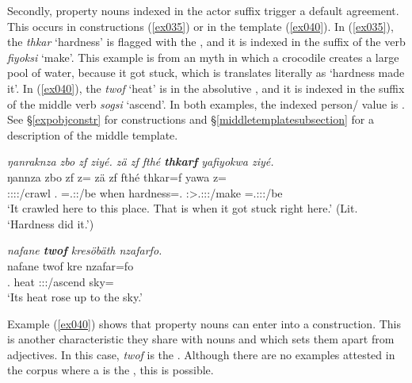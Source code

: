 Secondly, property nouns indexed in the actor suffix trigger a default   agreement. This occurs in  constructions (\ref{ex035}) or in the  template (\ref{ex040}). In (\ref{ex035}), the  \emph{thkar} `hardness' is flagged with the  , and it is indexed in the suffix of the verb \emph{fiyoksi} `make'. This example is from an myth in which a crocodile creates a large pool of water, because it got stuck, which is translates literally as `hardness made it'. In (\ref{ex040}), the  \emph{twof} `heat' is in the absolutive , and it is indexed in the suffix of the middle verb \emph{sogsi} `ascend'. In both examples, the indexed person/ value is \Stsg. See \S{}\ref{expobjconstr} for  constructions and \S{}\ref{middletemplatesubsection} for a description of the middle template.

\begin{exe}
	\ex \emph{ŋanraknza zbo zf ziyé. zä zf fthé \textbf{thkarf} yafiyokwa ziyé.}\\
	\gll ŋannza zbo zf z= zä zf fthé thkar=f yawa z=\\
	\Stsg:\Sbj:\Pst:\Ipfv:\Venit/crawl \Prox.\All{} \Imm{} \Prox=\Tsg.\Masc:\Sbj:\Nonpast/be \Prox{} \Imm{} when hardness=\Erg.\Sg{} \Stsg:\Sbj>\Tsg.\Masc:\Obj:\Pst:\Ipfv/make \Prox=\Tsg.\Masc:\Sbj:\Nonpast:\Ipfv/be\\
	\trans `It crawled here to this place. That is when it got stuck right here.' (Lit. `Hardness did it.')
	\label{ex035}
\end{exe}
\begin{exe}
	\ex \emph{nafane \textbf{twof} kresöbäth nzafarfo.}\\
	\gll nafane twof kre nzafar=fo\\
	\Tsg{}.\Poss{} heat \Stsg{}:\Sbj:\Irr:\Pfv{}/ascend sky=\All{}\\
	\trans `Its heat rose up to the sky.'
	\label{ex040}
\end{exe}

Example (\ref{ex040}) shows that property nouns can enter into a  construction. This is another characteristic they share with nouns and which sets them apart from adjectives. In this case, \emph{twof} is the . Although there are no examples attested in the corpus where a  is the , this is possible.\\

